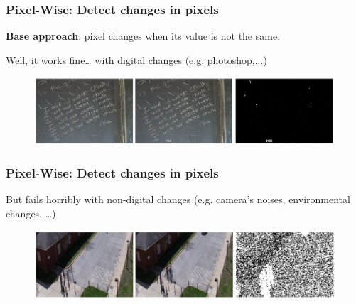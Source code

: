 \documentclass[13.5pt,aspecratio=169, xcolor=dvipsnames]{beamer}
\begin{document}
\begin{frame}
    \onehalfspacing
        \frametitle{Pixel-Wise: Detect changes in pixels}
        
        \begin{minipage}{0.9\textwidth}
            \begin{block}{}
                \textbf{Base approach}: pixel changes when its value is not the same.
            \end{block}
        \end{minipage}
        
        \bigskip

        Well, it works fine… with digital changes (e.g. photoshop,...)

        \bigskip

        \begin{figure}[h]
            \centering
            \includegraphics[width=\linewidth]{Pixel_wise_1.png}
        \end{figure}
      
\end{frame}
    

\begin{frame}
    \onehalfspacing
        \frametitle{Pixel-Wise: Detect changes in pixels}
        
        
        
        But fails horribly with non-digital changes (e.g. camera’s noises, environmental changes, …)


        \bigskip

        \begin{figure}[h]
            \centering
            \includegraphics[width=\linewidth]{Pixel_wise_2.png}
        \end{figure}
      
\end{frame}
    
\end{document}
